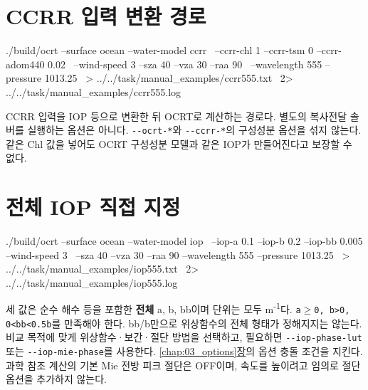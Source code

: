\section{CCRR 입력 변환 경로}
\label{sec:auto:04_examples:9}

\par\noindent\begin{minipage}{\linewidth}
\begin{ManualCode}
./build/ocrt --surface ocean --water-model ccrr \
  --ccrr-chl 1 --ccrr-tsm 0 --ccrr-adom440 0.02 \
  --wind-speed 3 --sza 40 --vza 30 --raa 90 \
  --wavelength 555 --pressure 1013.25 \
  > ../../task/manual_examples/ccrr555.txt \
  2> ../../task/manual_examples/ccrr555.log
\end{ManualCode}
\end{minipage}\par

CCRR 입력을 IOP 등으로 변환한 뒤 OCRT로 계산하는 경로다. 별도의 복사전달 솔버를 실행하는 옵션은 아니다. \texttt{-\allowbreak{}-\allowbreak{}ocrt-\allowbreak{}*}와 \texttt{-\allowbreak{}-\allowbreak{}ccrr-\allowbreak{}*}의 구성성분 옵션을 섞지 않는다. 같은 Chl 값을 넣어도 OCRT 구성성분 모델과 같은 IOP가 만들어진다고 보장할 수 없다.

\section{전체 IOP 직접 지정}
\label{sec:auto:04_examples:10}

\par\noindent\begin{minipage}{\linewidth}
\begin{ManualCode}
./build/ocrt --surface ocean --water-model iop \
  --iop-a 0.1 --iop-b 0.2 --iop-bb 0.005 --wind-speed 3 \
  --sza 40 --vza 30 --raa 90 --wavelength 555 --pressure 1013.25 \
  > ../../task/manual_examples/iop555.txt \
  2> ../../task/manual_examples/iop555.log
\end{ManualCode}
\end{minipage}\par

세 값은 순수 해수 등을 포함한 \textbf{전체} a, b, bb이며 단위는 모두 m\textsuperscript{-}\textsuperscript{1}다. \texttt{a\ensuremath{\geq}0,\allowbreak{} b>0,\allowbreak{} 0<bb<0.\allowbreak{}5b}를 만족해야 한다. bb/b만으로 위상함수의 전체 형태가 정해지지는 않는다. 비교 목적에 맞게 위상함수·보간·절단 방법을 선택하고, 필요하면 \texttt{-\allowbreak{}-\allowbreak{}iop-\allowbreak{}phase-\allowbreak{}lut} 또는 \texttt{-\allowbreak{}-\allowbreak{}iop-\allowbreak{}mie-\allowbreak{}phase}를 사용한다. \hyperref[chap:03_options]{\ref*{chap:03_options}장}의 옵션 충돌 조건을 지킨다. 과학 참조 계산의 기본 Mie 전방 피크 절단은 OFF이며, 속도를 높이려고 임의로 절단 옵션을 추가하지 않는다.

